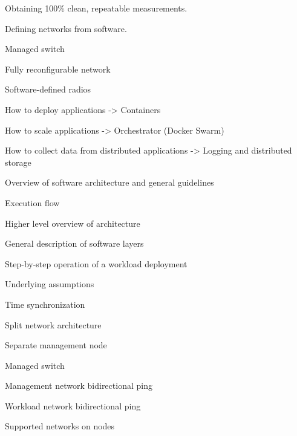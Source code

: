\begin{outline}
\begin{outline}
\begin{outline}
            \begin{outline}
                \item Obtaining 100\% clean, repeatable measurements.
                \item Defining networks from software.
                \begin{outline}
                    \item Managed switch
                    \item Fully reconfigurable network
                    \item Software-defined radios
                \end{outline}
                \item How to deploy applications -> Containers
                \item How to scale applications -> Orchestrator (Docker Swarm)
                \item How to collect data from distributed applications -> Logging and distributed storage 
            \end{outline}
        \end{outline}
        \item Overview of software architecture and general guidelines
        \begin{outline}
            \item Execution flow
            \begin{outline}
                \item Higher level overview of architecture
                \item General description of software layers
                \item Step-by-step operation of a workload deployment
            \end{outline}
            \item Underlying  assumptions
            \begin{outline}
                \item Time synchronization
                \item Split network architecture
                \item Separate management node
                \item Managed switch
                \item Management network bidirectional ping
                \item Workload network bidirectional ping
                \item Supported networks on nodes

\end{outline}
\end{outline}
\end{outline}
\end{outline}
